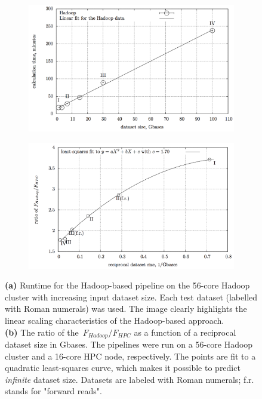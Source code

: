 \documentclass{bioinfo}
\begin{document}
\begin{methods}
\begin{enumerate}[(1)]
\end{enumerate}

\begin{figure}[!hb]

 \begin{subfigure}[b]{0.48\textwidth}
    \includegraphics[width=\textwidth]{figures/fig1-sep.png}
	\caption{}
		\label{fig:fig1}
        \end{subfigure}%
 \begin{subfigure}[b]{0.48\textwidth}
    \includegraphics[width=\textwidth]{figures/fig2-sep.png}
	\caption{}
	\label{fig:fig2}
        \end{subfigure}
	\caption{
	\textbf{(a)} Runtime for the Hadoop-based pipeline on the 56-core Hadoop cluster with
	increasing input dataset size. Each test dataset (labelled with Roman
	numerals) was used. The image clearly highlights the linear scaling
	characteristics of the Hadoop-based approach.\\
	\textbf{(b)} The ratio of the~$F_{Hadoop}/F_{HPC}$ as a function of a reciprocal
	dataset size in Gbases. The pipelines were run on a 56-core Hadoop cluster and
	a 16-core HPC node, respectively.
	The points are fit to a quadratic least-squares curve, which makes it possible
	to predict {\it infinite} dataset size. Datasets are labeled with Roman
	numerals; f.r. stands for "forward reads".
		}
\end{figure}




\end{methods}
\end{document}
